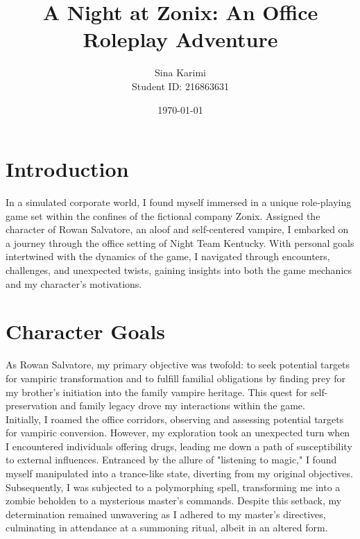 \title{A Night at Zonix: An Office Roleplay Adventure}
\author{Sina Karimi\\Student ID: 216863631}
\date{\today}


\maketitle
\newpage

\section*{Introduction}
In a simulated corporate world, I found myself immersed in a unique role-playing game set within the confines of the fictional company Zonix. Assigned the character of Rowan Salvatore, an aloof and self-centered vampire, I embarked on a journey through the office setting of Night Team Kentucky. With personal goals intertwined with the dynamics of the game, I navigated through encounters, challenges, and unexpected twists, gaining insights into both the game mechanics and my character's motivations.

\section*{Character Goals}
As Rowan Salvatore, my primary objective was twofold: to seek potential targets for vampiric transformation and to fulfill familial obligations by finding prey for my brother's initiation into the family vampire heritage. This quest for self-preservation and family legacy drove my interactions within the game. \\

Initially, I roamed the office corridors, observing and assessing potential targets for vampiric conversion. However, my exploration took an unexpected turn when I encountered individuals offering drugs, leading me down a path of susceptibility to external influences. Entranced by the allure of "listening to magic," I found myself manipulated into a trance-like state, diverting from my original objectives.\\

Subsequently, I was subjected to a polymorphing spell, transforming me into a zombie beholden to a mysterious master's commands. Despite this setback, my determination remained unwavering as I adhered to my master's directives, culminating in attendance at a summoning ritual, albeit in an altered form.\\

